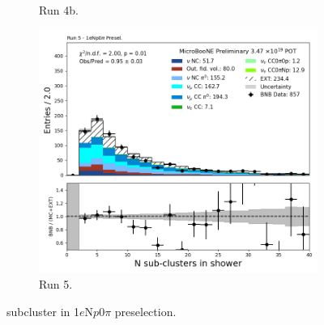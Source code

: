 \begin{figure}[H]
\begin{subfigure}[t]{0.32\linewidth}
        \caption{Run 4b.}
    \end{subfigure}%
    \hspace{0.2cm}%
    \begin{subfigure}[t]{0.32\linewidth}
        \includegraphics[width=\linewidth]{technote/Appendix_Preselection/Figures/1eNp0pi/Run5/subcluster_Run5_1eNp0pi_Presel.png}
        \caption{Run 5.}
    \end{subfigure}
    \caption{subcluster in 1$e$N$p$0$\pi$ preselection.}
\end{figure}

